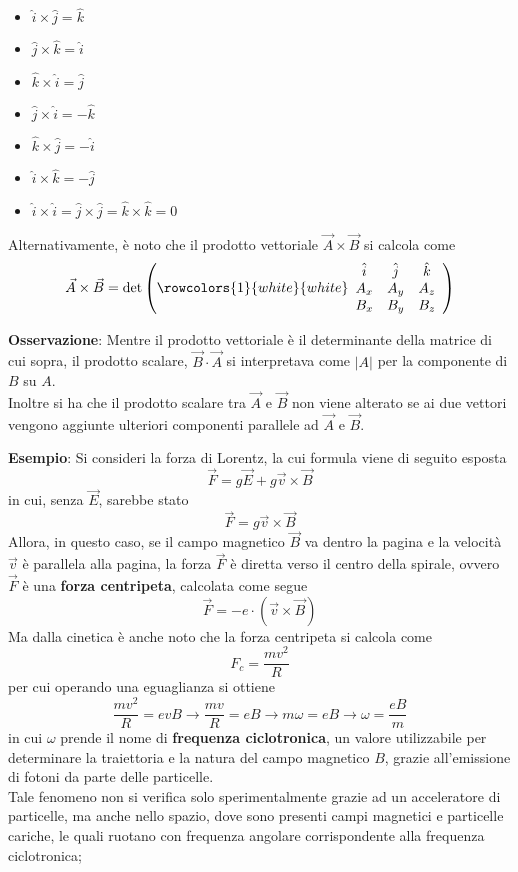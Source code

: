 \documentclass[a4paper]{extarticle}
\begin{document}
\begin{itemize}
  \item $\hat{i} \times \hat{j} = \hat{k}$
  \item $\hat{j} \times \hat{k} = \hat{i}$
  \item $\hat{k} \times \hat{i} = \hat{j}$
  \item $\hat{j} \times \hat{i} = -\hat{k}$
  \item $\hat{k} \times \hat{j} = -\hat{i}$
  \item $\hat{i} \times \hat{k} = -\hat{j}$
  \item $\hat{i} \times \hat{i} = \hat{j} \times \hat{j} = \hat{k} \times \hat{k} = 0$
\end{itemize}
Alternativamente, è noto che il prodotto vettoriale $\vec{A} \times \vec{B}$ si calcola come
\[\vec{A} \times \vec{B} = \det \left(
  \rowcolors{1}{white}{white}
  \begin{array}{ccc}
    \hat{i} & \hat{j} & \hat{k}\\
    A_x & A_y & A_z\\
    B_x & B_y & B_z
  \end{array}
\right)\]

\vspace{1em}
\noindent
\textbf{Osservazione}: Mentre il prodotto vettoriale è il determinante della matrice di cui sopra, il prodotto scalare, $\vec{B} \cdot \vec{A}$ si interpretava come $\vert A \vert$ per la componente di $B$ su $A$.\\
Inoltre si ha che il prodotto scalare tra $\vec{A}$ e $\vec{B}$ non viene alterato se ai due vettori vengono aggiunte ulteriori componenti parallele ad $\vec{A}$ e $\vec{B}$.

\vspace{1em}
\noindent
\textbf{Esempio}: Si consideri la forza di Lorentz, la cui formula viene di seguito esposta
\[\boxed{\vec{F} = g \vec{E} + g \vec{v} \times \vec{B}}\]
in cui, senza $\vec{E}$, sarebbe stato
\[\boxed{\vec{F} = g \vec{v} \times \vec{B}}\]
Allora, in questo caso, se il campo magnetico $\vec{B}$ va dentro la pagina e la velocità $\vec{v}$ è parallela alla pagina, la forza $\vec{F}$ è diretta verso il centro della spirale, ovvero $\vec{F}$ è una \textbf{forza centripeta}, calcolata come segue
\[\vec{F} = -e \cdot (\vec{v} \times \vec{B})\]
Ma dalla cinetica è anche noto che la forza centripeta si calcola come
\[F_c = \frac{m v^2}{R}\]
per cui operando una eguaglianza si ottiene
\[\frac{m v^2}{R} = e v B \longrightarrow \frac{m v}{R} = e B \longrightarrow m \omega = e B \longrightarrow \omega = \frac{eB}{m}\]
in cui $\omega$ prende il nome di \textbf{frequenza ciclotronica}, un valore utilizzabile per determinare la traiettoria e la natura del campo magnetico $B$, grazie all'emissione di fotoni da parte delle particelle.\\
Tale fenomeno non si verifica solo sperimentalmente grazie ad un acceleratore di particelle, ma anche nello spazio, dove sono presenti campi magnetici e particelle cariche, le quali ruotano con frequenza angolare corrispondente alla frequenza ciclotronica;
\end{document}
